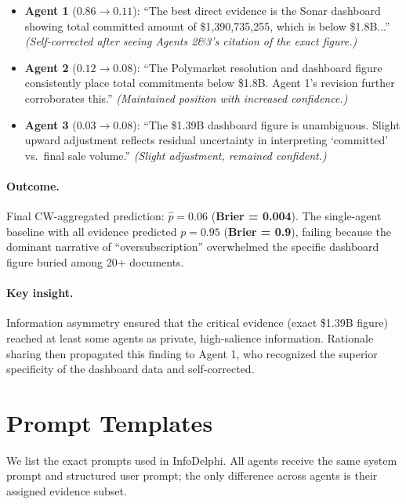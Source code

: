 \documentclass[11pt]{article}
\theoremstyle{plain}
\theoremstyle{definition}
\begin{document}
\begin{itemize}[nosep,leftmargin=15pt]
\item \textbf{Agent 1} ($0.86 \to 0.11$): ``The best direct evidence is the Sonar dashboard showing total committed amount of \$1,390,735,255, which is below \$1.8B...'' \textit{(Self-corrected after seeing Agents 2\&3's citation of the exact figure.)}

\item \textbf{Agent 2} ($0.12 \to 0.08$): ``The Polymarket resolution and dashboard figure consistently place total commitments below \$1.8B. Agent
1's revision further corroborates this.'' \textit{(Maintained position with increased confidence.)}

\item \textbf{Agent 3} ($0.03 \to 0.08$): ``The \$1.39B dashboard figure is unambiguous. Slight upward adjustment reflects residual uncertainty in interpreting `committed' vs.\ final sale volume.'' \textit{(Slight adjustment, remained confident.)}
\end{itemize}

\paragraph{Outcome.} Final CW-aggregated prediction: $\hat{p} = 0.06$ (\textbf{Brier = 0.004}). The single-agent baseline with all evidence predicted $p = 0.95$ (\textbf{Brier = 0.9}), failing because the dominant narrative of ``oversubscription'' overwhelmed the specific dashboard figure buried among 20+ documents.

\paragraph{Key insight.} Information asymmetry ensured that the critical evidence (exact \$1.39B figure) reached at least some agents as private, high-salience information. Rationale sharing then propagated this finding to Agent 1, who recognized the superior specificity of the dashboard data and self-corrected.

\section{Prompt Templates}
\label{sec:appendix_prompts}

We list the exact prompts used in InfoDelphi. All agents receive the same system prompt and structured user prompt; the only difference across agents is their assigned evidence subset.
\end{document}
